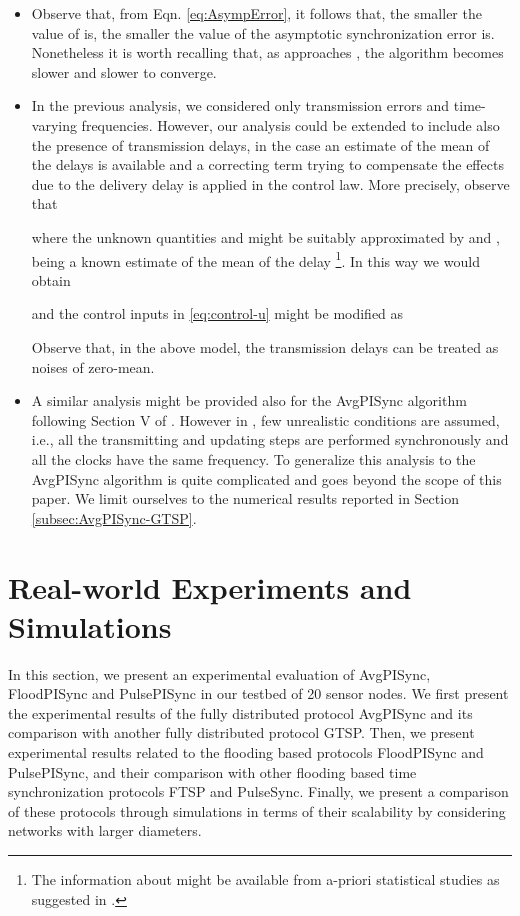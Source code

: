 \documentclass[english,a4paper,10pt,final]{article}
\numberwithin{equation}{section}
\numberwithin{figure}{section}
\begin{document}
\begin{itemize}
\item Observe that, from Eqn. \eqref{eq:AsympError}, it follows that, the smaller the value of  is, the smaller the value of the asymptotic synchronization error is. Nonetheless it is worth recalling that, as  approaches , the algorithm becomes slower and slower to converge. 

\item In the previous analysis, we considered only transmission errors and time-varying frequencies. 
However, our analysis could be extended to include also the presence of transmission delays, in the case an estimate of  the mean of the delays is available and a correcting term trying to compensate the effects due to the delivery delay is applied in the control law. More precisely, observe that

where the unknown quantities  and  might be suitably approximated by  and , being  a known estimate of the mean of the delay \footnote{The information about 
 might be available from a-priori statistical studies as suggested in \cite{ZZ-PPC-TH:09}.}. In this way we would obtain

and the control inputs in \eqref{eq:control-u} might be modified as

Observe that, in the above model, the transmission delays can be treated as noises of zero-mean.
\item  A similar analysis might be provided also for the AvgPISync algorithm following Section V of \cite{Carli_2011}. However in \cite{Carli_2011}, few unrealistic conditions are assumed, i.e., all the transmitting and updating steps are performed synchronously and all the clocks have the same frequency. To generalize this analysis to the AvgPISync algorithm is quite complicated and goes beyond the scope of this paper. We limit ourselves to the numerical results reported in Section \ref{subsec:AvgPISync-GTSP}.
\end{itemize}

\section{Real-world Experiments and Simulations}
\label{sec:Experiments}

In this section, we present an experimental evaluation of AvgPISync, FloodPISync and PulsePISync in our testbed of 20 sensor nodes. We first present the experimental results of the fully distributed protocol AvgPISync and its comparison with another fully distributed protocol GTSP. Then, we present experimental results related to the flooding based protocols FloodPISync and PulsePISync, and their comparison with other flooding based time synchronization protocols FTSP and PulseSync. Finally, we present a comparison of these protocols through simulations in terms of their scalability by considering networks with larger diameters.
\end{document}
